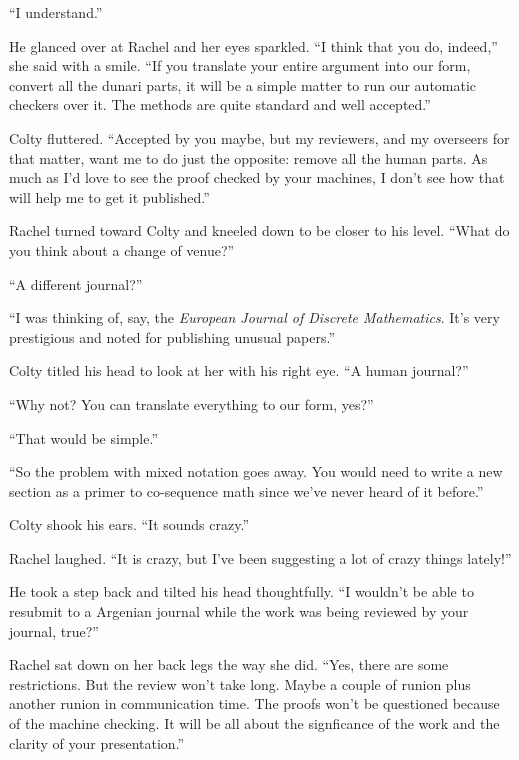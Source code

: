 ``I understand.''

He glanced over at Rachel and her eyes sparkled. ``I think that you do, indeed,'' she said with
a smile. ``If you translate your entire argument into our form, convert all the dunari parts, it
will be a simple matter to run our automatic checkers over it. The methods are quite standard
and well accepted.''

Colty fluttered. ``Accepted by you maybe, but my reviewers, and my overseers for that matter,
want me to do just the opposite: remove all the human parts. As much as I'd love to see the
proof checked by your machines, I don't see how that will help me to get it published.''

Rachel turned toward Colty and kneeled down to be closer to his level. ``What do you think about
a change of venue?''

``A different journal?''

``I was thinking of, say, the \textit{European Journal of Discrete Mathematics}. It's very
prestigious and noted for publishing unusual papers.''


Colty titled his head to look at her with his right eye. ``A human journal?''

``Why not? You can translate everything to our form, yes?''

``That would be simple.''

``So the problem with mixed notation goes away. You would need to write a new section as a
primer to co-sequence math since we've never heard of it before.''

Colty shook his ears. ``It sounds crazy.''

Rachel laughed. ``It is crazy, but I've been suggesting a lot of crazy things lately!''

He took a step back and tilted his head thoughtfully. ``I wouldn't be able to resubmit to a
Argenian journal while the work was being reviewed by your journal, true?''

Rachel sat down on her back legs the way she did. ``Yes, there are some restrictions. But the
review won't take long. Maybe a couple of runion plus another runion in communication time. The
proofs won't be questioned because of the machine checking. It will be all about the signficance
of the work and the clarity of your presentation.''

